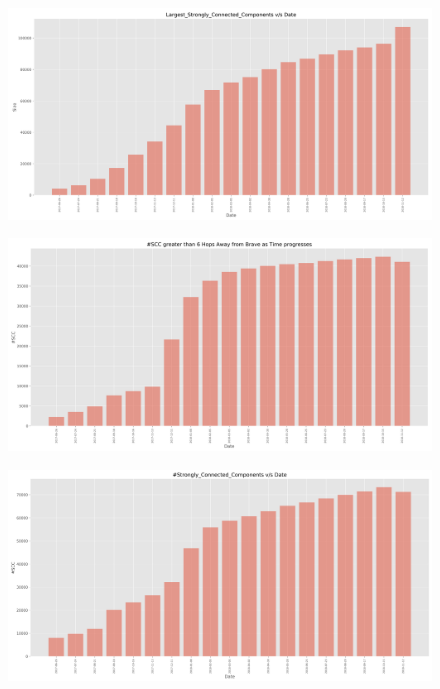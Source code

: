 \documentclass[sigconf]{acmart}
\begin{document}
\begin{figure}
\includegraphics[scale=0.06]{Largest_Strongly_Connected_Components_vs_Date.png}
\caption{}
\label{fig:largestsccvsdate}
\end{figure}

\begin{figure}
\includegraphics[scale=0.06]{SCC_greater_than_6_Hops_Away_from_Brave_as_Time_progresses.png}
\caption{ }
\label{fig:scc-hops-vs-date}
\end{figure}

\begin{figure}
\includegraphics[scale=0.06]{Strongly_Connected_Components_vs_Date.png}
\caption{ }
\label{fig:scc-vs-date}
\end{figure}
\end{document}

